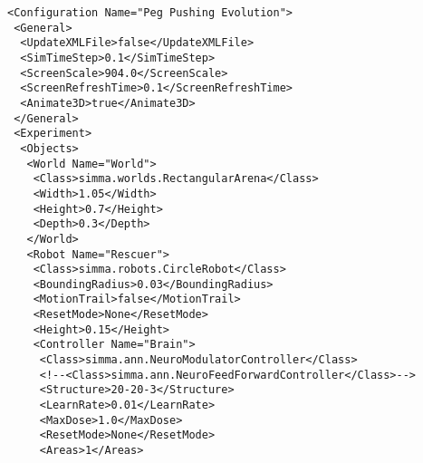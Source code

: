 \documentclass[12pt,fleqn,a4paper]{article}
\begin{document}
\lstset{language=XML}
\begin{lstlisting}
<Configuration Name="Peg Pushing Evolution">
 <General>
  <UpdateXMLFile>false</UpdateXMLFile>
  <SimTimeStep>0.1</SimTimeStep>
  <ScreenScale>904.0</ScreenScale>
  <ScreenRefreshTime>0.1</ScreenRefreshTime>
  <Animate3D>true</Animate3D>
 </General>
 <Experiment>
  <Objects>
   <World Name="World">
    <Class>simma.worlds.RectangularArena</Class>
    <Width>1.05</Width>
    <Height>0.7</Height>
    <Depth>0.3</Depth>
   </World>
   <Robot Name="Rescuer">
    <Class>simma.robots.CircleRobot</Class>
    <BoundingRadius>0.03</BoundingRadius>
    <MotionTrail>false</MotionTrail>
    <ResetMode>None</ResetMode>
    <Height>0.15</Height>
    <Controller Name="Brain">
     <Class>simma.ann.NeuroModulatorController</Class>
     <!--<Class>simma.ann.NeuroFeedForwardController</Class>-->
     <Structure>20-20-3</Structure>
     <LearnRate>0.01</LearnRate>
     <MaxDose>1.0</MaxDose>
     <ResetMode>None</ResetMode>
     <Areas>1</Areas>
     

\end{lstlisting}
\end{document}
